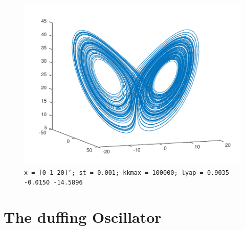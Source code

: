 \begin{figure}
\includegraphics[scale=0.5]{./plots/bestLorenz.pdf}
\caption{\texttt{x = [0 1 20]'; st = 0.001; kkmax = 100000; lyap = 0.9035   -0.0150  -14.5896}}
\label{fig:comp3}
\end{figure}

\section{The duffing Oscillator}


